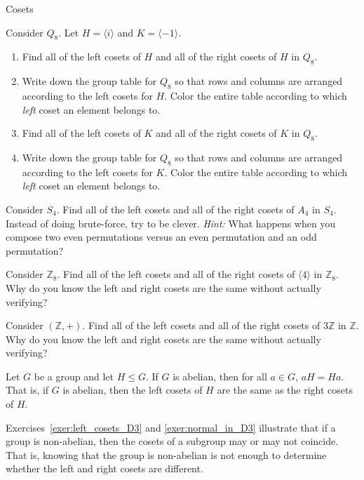 \begin{section}{Cosets}
\begin{exercise}\label{exer:normal_in_Q8}
Consider $Q_8$.  Let $H=\langle i\rangle$ and $K=\langle -1\rangle$.
\begin{enumerate}[label=\rm{(\alph*)}]
\item Find all of the left cosets of $H$ and all of the right cosets of $H$ in $Q_8$.  
\item Write down the group table for $Q_8$ so that rows and columns are arranged according to the left cosets for $H$.  Color the entire table according to which \emph{left} coset an element belongs to.
\item Find all of the left cosets of $K$ and all of the right cosets of $K$ in $Q_8$.
\item Write down the group table for $Q_8$ so that rows and columns are arranged according to the left cosets for $K$.  Color the entire table according to which \emph{left} coset an element belongs to.
\end{enumerate}
\end{exercise}

\begin{exercise}
Consider $S_4$.  Find all of the left cosets and all of the right cosets of $A_4$ in $S_4$. Instead of doing brute-force, try to be clever. \emph{Hint:} What happens when you compose two even permutations versus an even permutation and an odd permutation?
\end{exercise}

\begin{exercise}
Consider $\mathbb{Z}_8$.  Find all of the left cosets and all of the right cosets of $\langle 4\rangle$ in $\mathbb{Z}_8$. Why do you know the left and right cosets are the same without actually verifying?
\end{exercise}

\begin{exercise}
Consider $(\mathbb{Z},+)$.  Find all of the left cosets and all of the right cosets of $3\mathbb{Z}$ in $\mathbb{Z}$. Why do you know the left and right cosets are the same without actually verifying?
\end{exercise}

\begin{theorem}
Let $G$ be a group and let $H\leq G$. If $G$ is abelian, then for all $a\in G$, $aH=Ha$.  That is, if $G$ is abelian, then the left cosets of $H$ are the same as the right cosets of $H$.
\end{theorem}

Exercises~\ref{exer:left_cosets_D3} and \ref{exer:normal_in_D3} illustrate that if a group is non-abelian, then the cosets of a subgroup may or may not coincide.  That is, knowing that the group is non-abelian is not enough to determine whether the left and right cosets are different.


\end{section}
